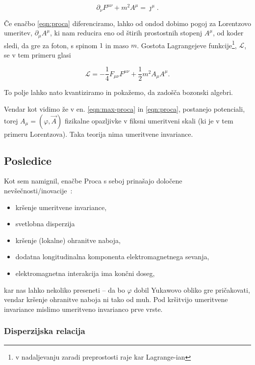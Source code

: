 \documentclass[a4paper, twocolumn, titlepage]{article}
\begin{document}
\begin{equation}
	\partial_\nu F^{\mu\nu} + m^2 A^\mu = \jmath^\mu.
	\label{eqn:proca}
\end{equation}

\v Ce ena\v cbo \eqref{eqn:proca} diferenciramo, lahko od ondod dobimo pogoj za Lorentzovo umeritev, $\partial_\mu
A^\mu$, ki nam reducira eno od \v stirih prostostnih stopenj $A^\mu$, od koder sledi, da gre za foton, s spinom $1$ in
maso $m$. Gostota Lagrangejeve funkcije\footnote{v nadaljevanju zaradi preprostosti raje kar Lagrange-ian}, $\mathcal{L}$,
se v tem primeru glasi

\begin{equation}
	\mathcal{L} = -\frac{1}{4}F_{\mu\nu}F^{\mu\nu} + \frac{1}{2}m^2A_\mu A^\mu.
	\label{eqn:proca-lagrangian}
\end{equation}

To polje lahko nato kvantiziramo in poka\v zemo, da zado\v s\v ca bozonski algebri.

Vendar kot vidimo \v ze v en. \eqref{eqn:max-proca} in \eqref{eqn:proca}, postanejo potenciali, torej $A_\mu =
(\varphi, \vec{A})$ fizikalne opazljivke v fiksni umeritveni skali (ki je v tem primeru Lorentzova). Taka teorija nima
umeritvene invariance.

\subsection{Posledice}

Kot sem namignil, ena\v cbe Proca s seboj prina\v sajo dolo\v cene nev\v se\v cnosti/inovacije~\cite{nieto1,nieto2,stueckelberg}:

\begin{itemize}
	\item{kr\v senje umeritvene invariance,}
	\item{svetlobna disperzija}
	\item{kr\v senje (lokalne) ohranitve naboja,}
	\item{dodatna longitudinalna komponenta elektromagnetnega sevanja,}
	\item{elektromagnetna interakcija ima kon\v cni doseg,}
\end{itemize}

kar nas lahko nekoliko preseneti -- da bo $\varphi$ dobil Yukawovo obliko gre pri\v cakovati, vendar kr\v senje ohranitve
naboja ni tako od muh. Pod kr\v sitvijo umeritvene invariance mislimo umeritveno invarianco prve vrste.

\subsubsection{Disperzijska relacija}
\end{document}
